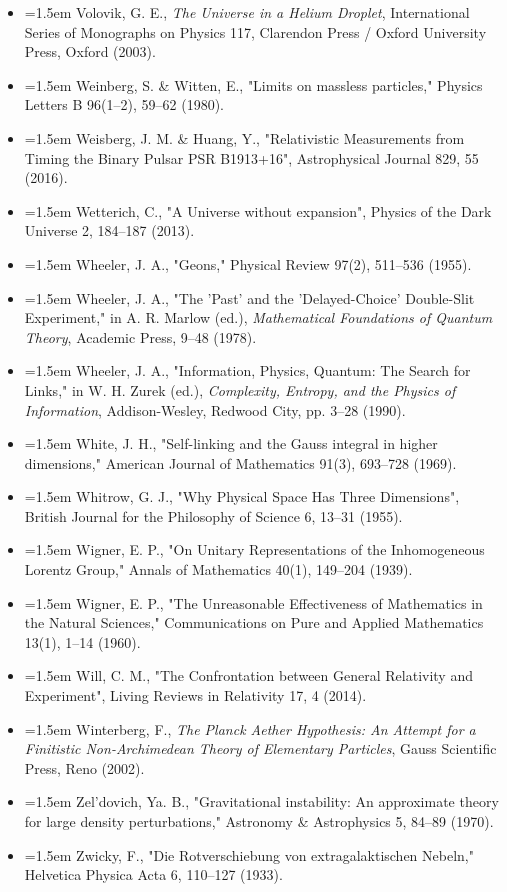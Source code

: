 \documentclass[11pt,a4paper]{article}
\begin{document}
\begin{itemize}[leftmargin=1.5em,label={}]
\item \hangindent=1.5em Volovik, G. E., \emph{The Universe in a Helium Droplet}, International Series of Monographs on Physics 117, Clarendon Press / Oxford University Press, Oxford (2003).
\item \hangindent=1.5em Weinberg, S. \& Witten, E., "Limits on massless particles," Physics Letters B 96(1–2), 59–62 (1980).
\item \hangindent=1.5em Weisberg, J. M. \& Huang, Y., "Relativistic Measurements from Timing the Binary Pulsar PSR B1913+16", Astrophysical Journal 829, 55 (2016).
\item \hangindent=1.5em Wetterich, C., "A Universe without expansion", Physics of the Dark Universe 2, 184–187 (2013).
\item \hangindent=1.5em Wheeler, J. A., "Geons," Physical Review 97(2), 511–536 (1955).
\item \hangindent=1.5em Wheeler, J. A., "The 'Past' and the 'Delayed-Choice' Double-Slit Experiment," in A. R. Marlow (ed.), \emph{Mathematical Foundations of Quantum Theory}, Academic Press, 9–48 (1978).
\item \hangindent=1.5em Wheeler, J. A., "Information, Physics, Quantum: The Search for Links," in W. H. Zurek (ed.), \emph{Complexity, Entropy, and the Physics of Information}, Addison-Wesley, Redwood City, pp. 3–28 (1990).
\item \hangindent=1.5em White, J. H., "Self-linking and the Gauss integral in higher dimensions," American Journal of Mathematics 91(3), 693–728 (1969).
\item \hangindent=1.5em Whitrow, G. J., "Why Physical Space Has Three Dimensions", British Journal for the Philosophy of Science 6, 13–31 (1955).
\item \hangindent=1.5em Wigner, E. P., "On Unitary Representations of the Inhomogeneous Lorentz Group," Annals of Mathematics 40(1), 149–204 (1939).
\item \hangindent=1.5em Wigner, E. P., "The Unreasonable Effectiveness of Mathematics in the Natural Sciences," Communications on Pure and Applied Mathematics 13(1), 1–14 (1960).
\item \hangindent=1.5em Will, C. M., "The Confrontation between General Relativity and Experiment", Living Reviews in Relativity 17, 4 (2014).
\item \hangindent=1.5em Winterberg, F., \emph{The Planck Aether Hypothesis: An Attempt for a Finitistic Non-Archimedean Theory of Elementary Particles}, Gauss Scientific Press, Reno (2002).
\item \hangindent=1.5em Zel'dovich, Ya. B., "Gravitational instability: An approximate theory for large density perturbations," Astronomy \& Astrophysics 5, 84–89 (1970).
\item \hangindent=1.5em Zwicky, F., "Die Rotverschiebung von extragalaktischen Nebeln," Helvetica Physica Acta 6, 110–127 (1933).
\end{itemize}
\end{document}
